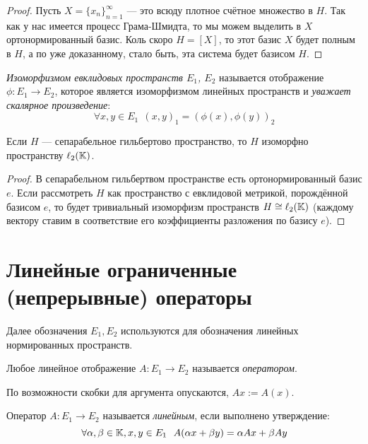 \begin{proof}
	Пусть $X = \{x_n\}_{n = 1}^\infty$ --- это всюду плотное счётное множество в $H$. Так как у нас имеется процесс Грама-Шмидта, то мы можем выделить в $X$ ортонормированный базис. Коль скоро $H = [X]$, то этот базис $X$ будет полным в $H$, а по уже доказанному, стало быть, эта система будет базисом $H$.
\end{proof}

\begin{definition}
	\textit{Изоморфизмом евклидовых пространств $E_1$, $E_2$} называется отображение $\phi \colon E_1 \to E_2$, которое является изоморфизмом линейных пространств и \textit{уважает скалярное произведение}:
	\[
		\forall x, y \in E_1\ \ (x, y)_1 = (\phi(x), \phi(y))_2
	\]
\end{definition}

\begin{theorem}
	Если $H$ --- сепарабельное гильбертово пространство, то $H$ изоморфно пространству $\ell_2(\mathbb{K})$.
\end{theorem}

\begin{proof}
	В сепарабельном гильбертвом пространстве есть ортонормированный базис $e$. Если рассмотреть $H$ как пространство с евклидовой метрикой, порождённой базисом $e$, то будет тривиальный изоморфизм пространств $H \cong \ell_2(\mathbb{K})$ (каждому вектору ставим в соответствие его коэффициенты разложения по базису $e$).
\end{proof}

\section{Линейные ограниченные (непрерывные) операторы}

\begin{note}
	Далее обозначения $E_1, E_2$ используются для обозначения линейных нормированных пространств.
\end{note}

\begin{definition}
	Любое линейное отображение $A \colon E_1 \to E_2$ называется \textit{оператором}.
\end{definition}

\begin{reminder}
	По возможности скобки для аргумента опускаются, $Ax := A(x)$.
\end{reminder}

\begin{definition}
	Оператор $A \colon E_1 \to E_2$ называется \textit{линейным}, если выполнено утверждение:
	\[
		\forall \alpha, \beta \in \K, x ,y \in E_1\ \ A(\alpha x + \beta y) = \alpha Ax + \beta Ay
	\]
\end{definition}

